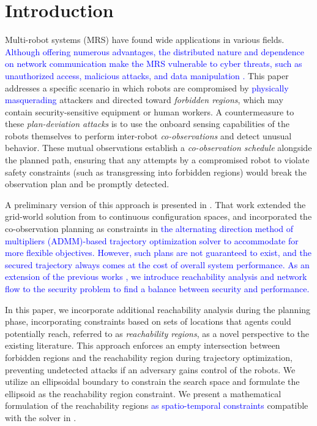 \documentclass[10pt,twocolumn,twoside]{IEEEtran}
\newcommand{\new}[1]{\textcolor{blue}{#1}}
\newcommand{\news}{\color{blue}}
\begin{document}
\section{Introduction}\label{sec:introduction}
Multi-robot systems (MRS) have found wide applications in various fields. \new{Although offering numerous advantages, the distributed nature and dependence on network communication make the MRS vulnerable to cyber threats, such as unauthorized access, malicious attacks, and data manipulation \cite{brunner2010infiltrating}.} This paper addresses a specific scenario in which robots are compromised by \new{physically masquerading} attackers and directed toward \emph{forbidden regions}, which may contain security-sensitive equipment or human workers. {\news A countermeasure to these \emph{plan-deviation attacks} \cite{wardega2019resilience, wardega2023byzantine, wardega2023hola} is to use the onboard sensing capabilities of the robots themselves to perform inter-robot \emph{co-observations} and detect unusual behavior.
These mutual observations establish a \emph{co-observation schedule} alongside the planned path, ensuring that any attempts by a compromised robot to violate safety constraints (such as transgressing into forbidden regions) would break the observation plan and be promptly detected.}

A preliminary version of this approach is presented in \cite{yang2020multi,yang2021multi}. That work extended the grid-world solution from \cite{wardega2019resilience} to continuous configuration spaces, and incorporated the co-observation planning as constraints in \new{the alternating direction method of multipliers (ADMM)-based trajectory optimization solver to accommodate for more flexible objectives. However, such plans are not guaranteed to exist, and the secured trajectory always comes at the cost of overall system performance. As an extension of the previous works \cite{yang2020multi,yang2021multi}, we introduce reachability analysis and network flow to the security problem to find a balance between security and performance.}

In this paper, we incorporate additional reachability analysis during the planning phase, incorporating constraints based on sets of locations that agents could potentially reach, referred to as \emph{reachability regions}, as a novel perspective to the existing literature. This approach enforces an empty intersection between forbidden regions and the reachability region during trajectory optimization, preventing undetected attacks if an adversary gains control of the robots. We utilize an ellipsoidal boundary to constrain the search space and formulate the ellipsoid as the reachability region constraint. We present a mathematical formulation of the reachability regions \new{as spatio-temporal constraints} compatible with the solver in \cite{yang2020multi}. 
\end{document}
